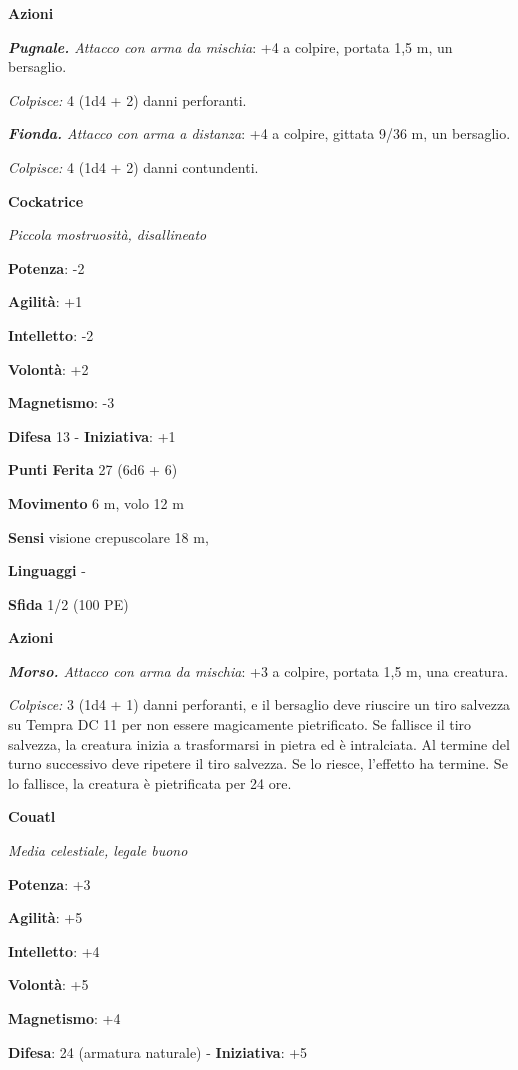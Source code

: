 \begin{multicols}{2}
\textbf{Azioni}

\emph{\textbf{Pugnale.} Attacco con arma da mischia}: +4 a colpire,
portata 1,5 m, un bersaglio.

\emph{Colpisce:} 4 (1d4 + 2) danni perforanti.

\emph{\textbf{Fionda.} Attacco con arma a distanza}: +4 a colpire,
gittata 9/36 m, un bersaglio.

\emph{Colpisce:} 4 (1d4 + 2) danni contundenti.

\textbf{Cockatrice}

\emph{Piccola mostruosità, disallineato}

\textbf{Potenza}: -2

\textbf{Agilità}: +1

\textbf{Intelletto}: -2

\textbf{Volontà}: +2

\textbf{Magnetismo}: -3

\textbf{Difesa} 13 - \textbf{Iniziativa}: +1

\textbf{Punti Ferita} 27 (6d6 + 6)

\textbf{Movimento} 6 m, volo 12 m

\textbf{Sensi} visione crepuscolare 18 m, 

\textbf{Linguaggi} -

\textbf{Sfida} 1/2 (100 PE)

\textbf{Azioni}

\emph{\textbf{Morso.} Attacco con arma da mischia}: +3 a colpire,
portata 1,5 m, una creatura.

\emph{Colpisce:} 3 (1d4 + 1) danni perforanti, e il bersaglio deve
riuscire un tiro salvezza su Tempra DC 11 per non essere
magicamente pietrificato. Se fallisce il tiro salvezza, la creatura
inizia a trasformarsi in pietra ed è intralciata. Al termine del turno
successivo deve ripetere il tiro salvezza. Se lo riesce, l'effetto ha
termine. Se lo fallisce, la creatura è pietrificata per 24 ore.



\textbf{Couatl}

\emph{Media celestiale, legale buono}

\textbf{Potenza}: +3

\textbf{Agilità}: +5

\textbf{Intelletto}: +4

\textbf{Volontà}: +5

\textbf{Magnetismo}: +4

\textbf{Difesa}: 24 (armatura naturale) - \textbf{Iniziativa}: +5


\end{multicols}
